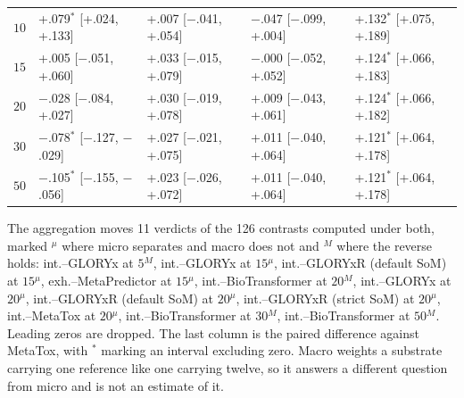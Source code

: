 \begin{table}[h]
\begin{threeparttable}
\begin{tabular}{rllll}
$10$ & +.079$^{*}$ [+.024, +.133] & +.007\phantom{$^{*}$} [$-$.041, +.054] & $-$.047\phantom{$^{*}$} [$-$.099, +.004] & +.132$^{*}$ [+.075, +.189] \\
$15$ & +.005\phantom{$^{*}$} [$-$.051, +.060] & +.033\phantom{$^{*}$} [$-$.015, +.079] & $-$.000\phantom{$^{*}$} [$-$.052, +.052] & +.124$^{*}$ [+.066, +.183] \\
$20$ & $-$.028\phantom{$^{*}$} [$-$.084, +.027] & +.030\phantom{$^{*}$} [$-$.019, +.078] & +.009\phantom{$^{*}$} [$-$.043, +.061] & +.124$^{*}$ [+.066, +.182] \\
$30$ & $-$.078$^{*}$ [$-$.127, $-$.029] & +.027\phantom{$^{*}$} [$-$.021, +.075] & +.011\phantom{$^{*}$} [$-$.040, +.064] & +.121$^{*}$ [+.064, +.178] \\
$50$ & $-$.105$^{*}$ [$-$.155, $-$.056] & +.023\phantom{$^{*}$} [$-$.026, +.072] & +.011\phantom{$^{*}$} [$-$.040, +.064] & +.121$^{*}$ [+.064, +.178] \\
\bottomrule
\end{tabular}
\begin{tablenotes}[flushleft]\footnotesize
\item The aggregation moves 11 verdicts of the 126 contrasts computed under both, marked $^{\mu}$ where micro separates and macro does not and $^{M}$ where the reverse holds: int.--GLORYx at $5$$^{M}$, int.--GLORYx at $15$$^{\mu}$, int.--GLORYxR (default SoM) at $15$$^{\mu}$, exh.--MetaPredictor at $15$$^{\mu}$, int.--BioTransformer at $20$$^{M}$, int.--GLORYx at $20$$^{\mu}$, int.--GLORYxR (default SoM) at $20$$^{\mu}$, int.--GLORYxR (strict SoM) at $20$$^{\mu}$, int.--MetaTox at $20$$^{\mu}$, int.--BioTransformer at $30$$^{M}$, int.--BioTransformer at $50$$^{M}$. Leading zeros are dropped. The last column is the paired difference against MetaTox, with $^{*}$ marking an interval excluding zero. Macro weights a substrate carrying one reference like one carrying twelve, so it answers a different question from micro and is not an estimate of it.
\end{tablenotes}
\end{threeparttable}
\end{table}
